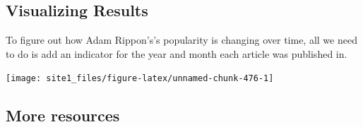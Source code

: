 \documentclass[]{book}
\newenvironment{Shaded}{\begin{snugshade}}{\end{snugshade}}
\newcommand{\CommentTok}[1]{\textcolor[rgb]{0.56,0.35,0.01}{\textit{#1}}}
\newcommand{\DataTypeTok}[1]{\textcolor[rgb]{0.13,0.29,0.53}{#1}}
\newcommand{\DecValTok}[1]{\textcolor[rgb]{0.00,0.00,0.81}{#1}}
\newcommand{\KeywordTok}[1]{\textcolor[rgb]{0.13,0.29,0.53}{\textbf{#1}}}
\newcommand{\NormalTok}[1]{#1}
\newcommand{\OperatorTok}[1]{\textcolor[rgb]{0.81,0.36,0.00}{\textbf{#1}}}
\newcommand{\StringTok}[1]{\textcolor[rgb]{0.31,0.60,0.02}{#1}}
\begin{document}
\hypertarget{visualizing-results}{%
\subsection{Visualizing Results}\label{visualizing-results}}

To figure out how Adam Rippon's's popularity is changing over time, all we need to do is add an indicator for the year and month each article was published in.

\begin{Shaded}
\end{Shaded}

\begin{center}\texttt{[image: site1\_files/figure-latex/unnamed-chunk-476-1]} \end{center}

\hypertarget{more-resources-1}{%
\subsection{More resources}\label{more-resources-1}}
\end{document}
